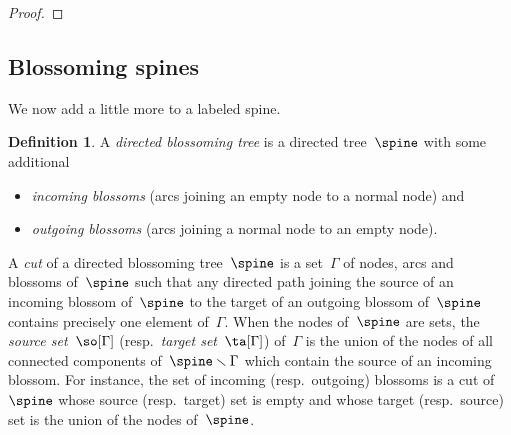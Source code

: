 \documentclass{amsart}
\theoremstyle{definition}
\newtheorem{definition}[theorem]{Definition}
\newcommand{\ssm}{\smallsetminus} %
\newcommand{\darkblue}{\color{darkblue}} %
\newcommand{\defn}[1]{\textsl{\darkblue #1}} %
\newcommand{\vincent}[1]{\todo[color=blue!30]{#1 \\ \hfill --- V.}}
\begin{document}
\begin{proof}
  \vincent{todo}
\end{proof}


\subsection{Blossoming spines}
\label{subsec:blossomingSpines}

We now add a little more to a labeled spine.

\begin{definition}
  \label{def:blossomingTree}
  A \defn{directed blossoming tree} is a directed tree~$\spine$ with some additional 
  \begin{itemize}
    \item \defn{incoming blossoms} (arcs joining an empty node to a normal node) and 
    \item \defn{outgoing blossoms} (arcs joining a normal node to an empty node).
  \end{itemize}
  A \defn{cut} of a directed blossoming tree~$\spine$ is a set~$\Gamma$ of nodes, arcs and blossoms of~$\spine$ such that any directed path joining the source of an incoming blossom of~$\spine$ to the target of an outgoing blossom of~$\spine$ contains precisely one element of~$\Gamma$.
  When the nodes of~$\spine$ are sets, the \defn{source set}~$\so[\Gamma]$ (resp.~\defn{target set}~$\ta[\Gamma]$) of~$\Gamma$ is the union of the nodes of all connected components of~$\spine \ssm \Gamma$ which contain the source of an incoming blossom.
  For instance, the set of incoming (resp.~outgoing) blossoms is a cut of~$\spine$ whose source (resp.~target) set is empty and whose target (resp.~source) set is the union of the nodes of~$\spine$.
\end{definition}

\end{document}
